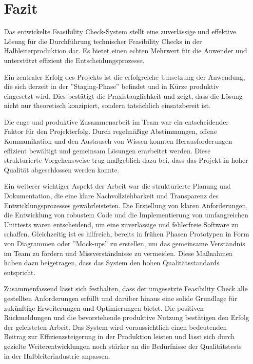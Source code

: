 \chapter{Fazit}

Das entwickelte Feasibility Check-System stellt eine zuverlässige und effektive Lösung für die Durchführung technischer Feasibility Checks in der Halbleiterproduktion dar. Es bietet einen echten Mehrwert für die Anwender und unterstützt effizient die Entscheidungsprozesse.

Ein zentraler Erfolg des Projekts ist die erfolgreiche Umsetzung der Anwendung, die sich derzeit in der ''Staging-Phase'' befindet und in Kürze produktiv eingesetzt wird. Dies bestätigt die Praxistauglichkeit und zeigt, dass die Lösung nicht nur theoretisch konzipiert, sondern tatsächlich einsatzbereit ist.

Die enge und produktive Zusammenarbeit im Team war ein entscheidender Faktor für den Projekterfolg. Durch regelmäßige Abstimmungen, offene Kommunikation und den Austausch von Wissen konnten Herausforderungen effizient bewältigt und gemeinsam Lösungen erarbeitet werden. Diese strukturierte Vorgehensweise trug maßgeblich dazu bei, dass das Projekt in hoher Qualität abgeschlossen werden konnte.

Ein weiterer wichtiger Aspekt der Arbeit war die strukturierte Planung und Dokumentation, die eine klare Nachvollziehbarkeit und Transparenz des Entwicklungsprozesses gewährleisteten. Die Erstellung von klaren Anforderungen, die Entwicklung von robustem Code und die Implementierung von umfangreichen Unittests waren entscheidend, um eine zuverlässige und fehlerfreie Software zu schaffen. Gleichzeitig ist es hilfreich, bereits in frühen Phasen Prototypen in Form von Diagrammen oder ''Mock-ups'' zu erstellen, um das gemeinsame Verständnis im Team zu fördern und Missverständnisse zu vermeiden. Diese Maßnahmen haben dazu beigetragen, dass das System den hohen Qualitätsstandards entspricht.

Zusammenfassend lässt sich festhalten, dass der umgesetzte Feasibility Check alle gestellten Anforderungen erfüllt und darüber hinaus eine solide Grundlage für zukünftige Erweiterungen und Optimierungen bietet. Die positiven Rückmeldungen und die bevorstehende produktive Nutzung bestätigen den Erfolg der geleisteten Arbeit. Das System wird voraussichtlich einen bedeutenden Beitrag zur Effizienzsteigerung in der Produktion leisten und lässt sich durch gezielte Weiterentwicklungen noch stärker an die Bedürfnisse der Qualitätstests in der Halbleiterindustrie anpassen.




